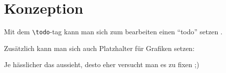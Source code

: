 \section{Konzeption}\label{sec:konzeption}

Mit dem \lstinline{\todo}-tag kann man sich zum bearbeiten einen \enquote{todo} setzen .

Zusätzlich kann man sich auch Platzhalter für Grafiken setzen:


Je hässlicher das aussieht, desto eher versucht man es zu fixen ;)

